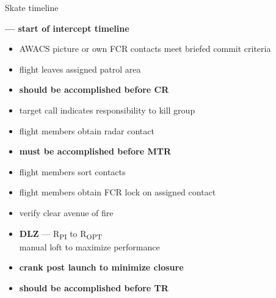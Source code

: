 \begin{checklistenumerate}[start=0]
{\begin{tikzpicture}[figstyle]

        \end{tikzpicture}
        \caption{Skate timeline}
        \label{fig:ttpaa:timeline:skate}
    }%
    \textbf{--- start of intercept timeline}
    \begin{itemize}
        \item AWACS picture or own FCR contacts meet briefed commit criteria
        \item flight leaves assigned patrol area
        \item \textbf{should be accomplished before CR}
    \end{itemize}

    \blueitem[Target]
    \label{subsec:ttpaa:timeline:skate:target}
    \begin{itemize}
        \item target call indicates responsibility to kill group
        \item flight members obtain radar contact
        \item \textbf{must be accomplished before MTR}
    \end{itemize}

    \blueitem[Sort]
    \label{subsec:ttpaa:timeline:skate:sort}
    \begin{itemize}
        \item flight members sort contacts
        \item flight members obtain FCR lock on assigned contact
    \end{itemize}

    \blueitem[Employment]
    \label{subsec:ttpaa:timeline:skate:shoot}
    \begin{itemize} 
        \item verify clear avenue of fire
        \item \textbf{DLZ} --- R\textsubscript{PI} to R\textsubscript{OPT}\\
        manual loft to maximize performance
        \item \textbf{crank post launch to minimize closure}
        \item \textbf{should be accomplished before TR}
    \end{itemize}

    


\end{checklistenumerate}
